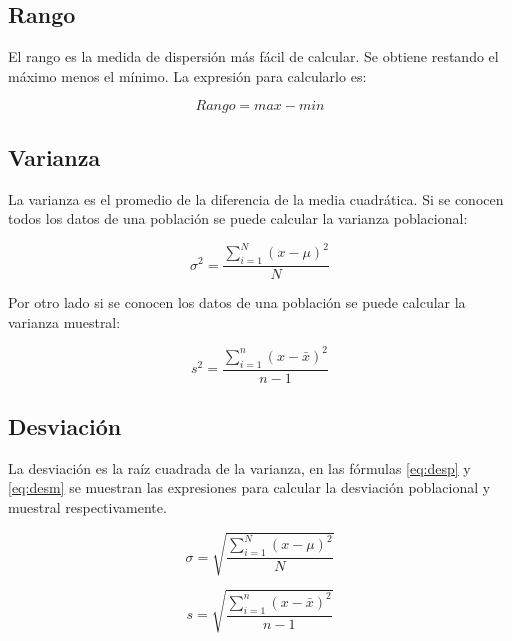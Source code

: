 \documentclass[]{book}
\begin{document}
\subsection{Rango}\label{rango}

El rango es la medida de dispersión más fácil de calcular. Se obtiene
restando el máximo menos el mínimo. La expresión para calcularlo es:

\begin{equation} 
  Rango = max - min
  \label{eq:rg}
\end{equation}

\subsection{Varianza}\label{varianza}

La varianza es el promedio de la diferencia de la media cuadrática. Si
se conocen todos los datos de una población se puede calcular la
varianza poblacional:

\begin{equation} 
  \sigma^2 = \dfrac{\sum_{i=1}^{N}\left(x- \mu \right)^2}{N}
  \label{eq:varp}
\end{equation}

Por otro lado si se conocen los datos de una población se puede calcular
la varianza muestral:

\begin{equation} 
  s^2 = \dfrac{\sum_{i=1}^{n}\left(x- \bar{x} \right)^2}{n-1}
  \label{eq:varm}
\end{equation}

\subsection{Desviación}\label{desviacion}

La desviación es la raíz cuadrada de la varianza, en las fórmulas
\eqref{eq:desp} y \eqref{eq:desm} se muestran las expresiones para calcular
la desviación poblacional y muestral respectivamente.

\begin{equation} 
  \sigma = \sqrt{\dfrac{\sum_{i=1}^{N}\left(x- \mu \right)^2}{N}}
  \label{eq:desp}
\end{equation}

\begin{equation} 
  s = \sqrt{\dfrac{\sum_{i=1}^{n}\left(x- \bar{x} \right)^2}{n-1}}
  \label{eq:desm}
\end{equation}
\end{document}
